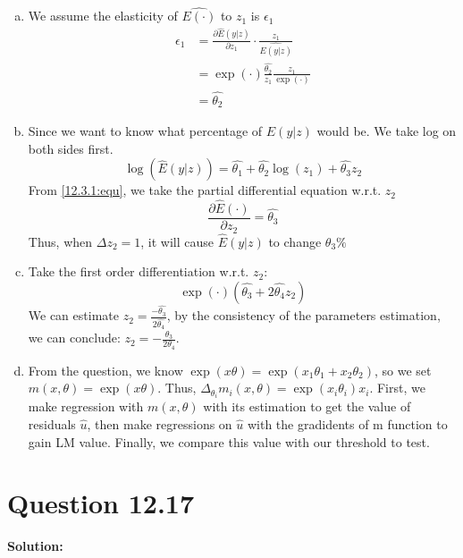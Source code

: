 \documentclass[11pt]{article} %
\begin{document}
\begin{enumerate}[a.]
	\item We assume the elasticity of $\hat{E(\cdot)}$ to $z_1$ is $\epsilon_1$
		\begin{align*}
			\epsilon_1&= \frac{\partial \hat{E}(y|z)}{\partial z_1}\cdot \frac{z_1}{\hat{E(y|z)}}\\
					&= \exp(\cdot )\frac{\hat{\theta_2}}{z_1}\frac{z_1}{\exp(\cdot)}\\
					&= \hat{\theta_2}
		\end{align*}
	\item Since we want to know what percentage of $E(y|z)$ would be. We take log on both sides first.
	\begin{equation}\tag*{(12.3.1)}\label{12.3.1:equ}
		\log(\hat{E}(y|z))=\hat{\theta_1}+\hat{\theta_2}\log(z_1)+\hat{\theta_3}z_2
	\end{equation}
	From \ref{12.3.1:equ}, we take the partial differential equation w.r.t. $z_2$
	\begin{equation*}
		\frac{\partial \hat{E}(\cdot)}{\partial z_2}=\hat{\theta_3}
	\end{equation*}
	Thus, when $\Delta z_2=1$, it will cause $\hat{E}(y|z)$ to change $\theta_3\%$
	\item Take the first order differentiation w.r.t. $z_2$:
		\begin{equation*}
			\exp(\cdot)(\hat{\theta_3}+2\hat{\theta_4}z_2)
		\end{equation*}
		We can estimate $z_2=\frac{-\hat{\theta_3}}{2\hat{\theta_4}}$, by the consistency of the parameters estimation, we can conclude:  $z_2=-\frac{\theta_3}{2\theta_4}$.
	\item From the question, we know $\exp(x\theta)=\exp(x_1\theta_1+x_2\theta_2)$, so we set $m(x,\theta)=\exp(x\theta)$. Thus, $\Delta_{\theta_i} m_i(x,\theta)=\exp(x_i\theta_i)x_i$.
	First, we make regression with $m(x,\theta)$ with its estimation to get the value of residuals $\hat{u}$, then make regressions on $\hat{u}$ with the gradidents of m function to gain LM value. Finally, we compare this value with our threshold to test. 
\end{enumerate}





\section{Question 12.17}
\textbf{Solution:}
\end{document}
